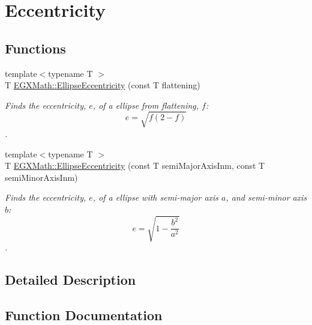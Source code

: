 \hypertarget{group___e_g_x_math-_geometry-2_d-_ellipse-_eccentricity}{}\section{Eccentricity}
\label{group___e_g_x_math-_geometry-2_d-_ellipse-_eccentricity}
\subsection*{Functions}
\begin{DoxyCompactItemize}
\item 
{\footnotesize template$<$typename T $>$ }\\T \mbox{\hyperlink{group___e_g_x_math-_geometry-2_d-_ellipse-_eccentricity_ga6a0a7fba17f782616894cfc447628c33}{E\+G\+X\+Math\+::\+Ellipse\+Eccentricity}} (const T flattening)
\begin{DoxyCompactList}\small\item\em Finds the eccentricity, $e$, of a ellipse from flattening, $f$\+: \[ e = \sqrt{f (2 - f)} \]. \end{DoxyCompactList}\item 
{\footnotesize template$<$typename T $>$ }\\T \mbox{\hyperlink{group___e_g_x_math-_geometry-2_d-_ellipse-_eccentricity_ga4e01cf027d303bb4ecb75606e5240d6c}{E\+G\+X\+Math\+::\+Ellipse\+Eccentricity}} (const T semi\+Major\+Axis\+Inm, const T semi\+Minor\+Axis\+Inm)
\begin{DoxyCompactList}\small\item\em Finds the eccentricity, $e$, of a ellipse with semi-\/major axis $a$, and semi-\/minor axis $b$\+: \[ e = \sqrt{1-\frac{b^2}{a^2}}\]. \end{DoxyCompactList}\end{DoxyCompactItemize}


\subsection{Detailed Description}


\subsection{Function Documentation}
\mbox{\label{group___e_g_x_math-_geometry-2_d-_ellipse-_eccentricity_ga6a0a7fba17f782616894cfc447628c33}} 

